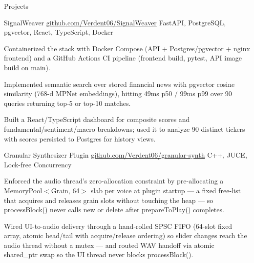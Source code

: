 \documentclass[
	11pt
]{../../../template}
\begin{document}
	\begin{rSection}{P}{rojects}
		\begin{rSectionEntry}
			{SignalWeaver}
			{\href{https://github.com/Verdent06/SignalWeaver}{github.com/Verdent06/SignalWeaver}}
			{}
			{FastAPI, PostgreSQL, pgvector, React, TypeScript, Docker}
			{}

			\item Containerized the stack with Docker Compose (API + Postgres/pgvector + nginx frontend) and a GitHub Actions CI pipeline (frontend build, pytest, API image build on main).
			\item Implemented semantic search over stored financial news with pgvector cosine similarity (768-d MPNet embeddings), hitting 49ms p50 / 99ms p99 over 90 queries returning top-5 or top-10 matches.
			\item Built a React/TypeScript dashboard for composite scores and fundamental/sentiment/macro breakdowns; used it to analyze 90 distinct tickers with scores persisted to Postgres for history views.
		\end{rSectionEntry}

		\begin{rSectionEntry}
			{Granular Synthesizer Plugin}
			{\href{https://github.com/Verdent06/granular-synth}{github.com/Verdent06/granular-synth}}
			{}
			{C++, JUCE, Lock-free Concurrency}
			{}

			\item Enforced the audio thread's zero-allocation constraint by pre-allocating a MemoryPool$<$Grain, 64$>$ slab per voice at plugin startup — a fixed free-list that acquires and releases grain slots without touching the heap — so processBlock() never calls new or delete after prepareToPlay() completes.
			\item Wired UI-to-audio delivery through a hand-rolled SPSC FIFO (64-slot fixed array, atomic head/tail with acquire/release ordering) so slider changes reach the audio thread without a mutex — and routed WAV handoff via atomic shared\_ptr swap so the UI thread never blocks processBlock().
		\end{rSectionEntry}
	\end{rSection}
\end{document}
